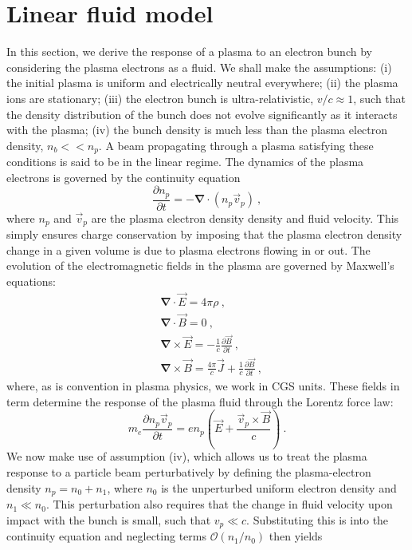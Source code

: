 \section{Linear fluid model }
In this section, we derive the response of a plasma to an electron bunch by considering the plasma electrons as a fluid. We shall make the assumptions:  (i) the initial plasma is uniform and electrically neutral everywhere; (ii) the plasma ions are stationary; (iii) the electron bunch is ultra-relativistic, $v/c\approx 1$, such that the density distribution of the bunch does not evolve significantly as it interacts with the plasma; (iv) the bunch density is much less than the plasma electron density, $n_b<<n_p$.  A beam propagating through a plasma satisfying these conditions is said to be in the linear regime. The dynamics of the plasma electrons is governed by the continuity equation
\begin{equation}
\frac{\partial n_p}{\partial t}=-\mathbf{\nabla}\cdot (n_p\vec{v}_p)~,
\end{equation}
where $n_p$ and $\vec{v}_p$ are the plasma electron density density and fluid velocity. This simply ensures charge conservation by imposing that the plasma electron density change in a given volume is due to plasma electrons flowing in or out. The evolution of the electromagnetic fields in the plasma are governed by Maxwell's equations:
\begin{align}
\label{Maxwell1}
&\boldsymbol{\nabla}\cdot \vec{E}=4\pi \rho~,\\
&\boldsymbol{\nabla}\cdot \vec{B}=0~,\\
&\boldsymbol{\nabla}\times \vec{E}=-\frac{1}{c}\frac{\partial \vec{B}}{\partial t} ~,\\
&\boldsymbol{\nabla}\times \vec{B}=\frac{4\pi}{c}\vec{J}+\frac{1}{c}\frac{\partial \vec{B}}{\partial t}~,
\label{Maxwell4}
\end{align}
where, as is convention in plasma physics, we work in CGS units. 
These fields in term determine the response of the plasma fluid through the Lorentz force law:
\begin{equation}
m_e\frac{\partial n_p\vec{v}_p}{\partial t}=en_p\left(\vec{E}+\frac{\vec{v}_p\times \vec{B}}{c}\right)~.
\end{equation}
We now make use of assumption (iv), which allows us to treat the plasma response to a particle beam perturbatively by defining the plasma-electron density $n_p=n_0+n_1$, where $n_0$ is the unperturbed uniform electron density and $n_1\ll n_0$. This perturbation also requires that the change in fluid velocity upon impact with the bunch is small, such that $v_p\ll c$. Substituting this is into the continuity equation  and neglecting terms $\mathcal{O}(n_1/n_0)$ then yields 
